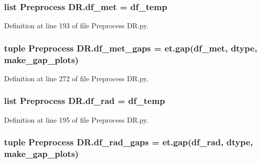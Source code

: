 \subsubsection[{df\+\_\+met}]{\setlength{\rightskip}{0pt plus 5cm}list Preprocess D\+R.\+df\+\_\+met = {\bf df\+\_\+temp}}\label{namespace_preprocess_01_d_r_a76371d4dc94517f100a4b6c2a44a66e9}


Definition at line 193 of file Preprocess D\+R.\+py.

\hypertarget{namespace_preprocess_01_d_r_af20162928bf03c462be487f066a127a2}{}
\subsubsection[{df\+\_\+met\+\_\+gaps}]{\setlength{\rightskip}{0pt plus 5cm}tuple Preprocess D\+R.\+df\+\_\+met\+\_\+gaps = et.\+gap({\bf df\+\_\+met}, {\bf dtype}, {\bf make\+\_\+gap\+\_\+plots})}\label{namespace_preprocess_01_d_r_af20162928bf03c462be487f066a127a2}


Definition at line 272 of file Preprocess D\+R.\+py.

\hypertarget{namespace_preprocess_01_d_r_ad42c5899e061416e7420e073b0a4eae4}{}
\subsubsection[{df\+\_\+rad}]{\setlength{\rightskip}{0pt plus 5cm}list Preprocess D\+R.\+df\+\_\+rad = {\bf df\+\_\+temp}}\label{namespace_preprocess_01_d_r_ad42c5899e061416e7420e073b0a4eae4}


Definition at line 195 of file Preprocess D\+R.\+py.

\hypertarget{namespace_preprocess_01_d_r_ad19ea2575c12e287c8750139b04267ad}{}
\subsubsection[{df\+\_\+rad\+\_\+gaps}]{\setlength{\rightskip}{0pt plus 5cm}tuple Preprocess D\+R.\+df\+\_\+rad\+\_\+gaps = et.\+gap({\bf df\+\_\+rad}, {\bf dtype}, {\bf make\+\_\+gap\+\_\+plots})}\label{namespace_preprocess_01_d_r_ad19ea2575c12e287c8750139b04267ad}


